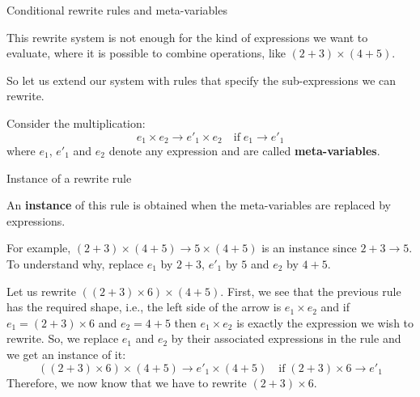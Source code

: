 %
\begin{frame}{Conditional rewrite rules and meta-variables}

  This rewrite system is not enough for the kind of expressions we
  want to evaluate, where it is possible to combine operations, like
  \((2+3) \times (4+5)\).

  \bigskip

  So let us extend our system with rules that specify the
  sub-expressions we can rewrite.

  \bigskip

  Consider the multiplication:
  \begin{equation*}
    e_1 \times e_2 \rightarrow e'_1 \times e_2 \quad \text{if} \; e_1
    \rightarrow e'_1
  \end{equation*}
  where \(e_1\), \(e'_1\) and \(e_2\) denote any expression and are
  called \textbf{meta\hyp{}variables}.

\end{frame}

%
\begin{frame}{Instance of a rewrite rule}

  An \textbf{instance} of this rule is obtained when the
  meta-variables are replaced by expressions.

  \bigskip

  For example, \( (2+3) \times (4+5) \rightarrow 5 \times (4+5) \) is
  an instance since \(2 + 3 \rightarrow 5\). To understand why,
  replace \(e_1\) by \(2+3\), \(e'_1\) by \(5\) and \(e_2\) by
  \(4+5\).

  \bigskip

  Let us rewrite \(((2 + 3) \times 6) \times (4+5)\). First, we see
  that the previous rule has the required shape, i.e., the left side
  of the arrow is \(e_1 \times e_2\) and if \(e_1 = (2+3) \times 6\)
  and \(e_2 = 4+5\) then \(e_1 \times e_2\) is exactly the expression
  we wish to rewrite. So, we replace \(e_1\) and \(e_2\) by their
  associated expressions in the rule and we get an instance of it:
  \begin{equation*}
    ((2 + 3) \times 6) \times (4+5) \rightarrow e'_1 \times (4+5)
    \quad \text{if} \; (2+3) \times 6 \rightarrow e'_1
  \end{equation*}
  Therefore, we now know that we have to rewrite \((2 + 3) \times 6\).

\end{frame}

